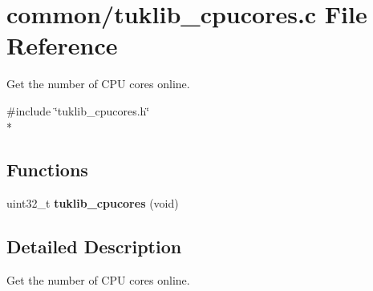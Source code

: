 \section{common/tuklib\-\_\-cpucores.c File Reference}
\label{tuklib__cpucores_8c}


Get the number of C\-P\-U cores online.  


{\ttfamily \#include \char`\"{}tuklib\-\_\-cpucores.\-h\char`\"{}}\\*
\subsection*{Functions}
\begin{DoxyCompactItemize}
\item 
uint32\-\_\-t {\bfseries tuklib\-\_\-cpucores} (void)\label{tuklib__cpucores_8c_a29a46012d8b74be2f52214798c17dd79}

\end{DoxyCompactItemize}


\subsection{Detailed Description}
Get the number of C\-P\-U cores online. 